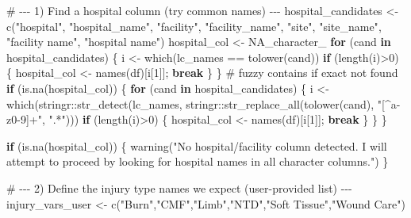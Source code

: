 \documentclass[
  letterpaper,
  DIV=11,
  numbers=noendperiod]{scrartcl}
\newenvironment{Shaded}{\begin{snugshade}}{\end{snugshade}}
\newcommand{\CommentTok}[1]{\textcolor[rgb]{0.37,0.37,0.37}{#1}}
\newcommand{\ConstantTok}[1]{\textcolor[rgb]{0.56,0.35,0.01}{#1}}
\newcommand{\ControlFlowTok}[1]{\textcolor[rgb]{0.00,0.23,0.31}{\textbf{#1}}}
\newcommand{\DecValTok}[1]{\textcolor[rgb]{0.68,0.00,0.00}{#1}}
\newcommand{\FunctionTok}[1]{\textcolor[rgb]{0.28,0.35,0.67}{#1}}
\newcommand{\NormalTok}[1]{\textcolor[rgb]{0.00,0.23,0.31}{#1}}
\newcommand{\OtherTok}[1]{\textcolor[rgb]{0.00,0.23,0.31}{#1}}
\newcommand{\SpecialCharTok}[1]{\textcolor[rgb]{0.37,0.37,0.37}{#1}}
\newcommand{\StringTok}[1]{\textcolor[rgb]{0.13,0.47,0.30}{#1}}
\begin{document}
\begin{Shaded}
\begin{Highlighting}[]
\CommentTok{\# {-}{-}{-} 1) Find a hospital column (try common names) {-}{-}{-}}
\NormalTok{hospital\_candidates }\OtherTok{\textless{}{-}} \FunctionTok{c}\NormalTok{(}\StringTok{"hospital"}\NormalTok{, }\StringTok{"hospital\_name"}\NormalTok{, }\StringTok{"facility"}\NormalTok{, }\StringTok{"facility\_name"}\NormalTok{, }\StringTok{"site"}\NormalTok{, }\StringTok{"site\_name"}\NormalTok{, }\StringTok{"facility name"}\NormalTok{, }\StringTok{"hospital name"}\NormalTok{)}
\NormalTok{hospital\_col }\OtherTok{\textless{}{-}} \ConstantTok{NA\_character\_}
\ControlFlowTok{for}\NormalTok{ (cand }\ControlFlowTok{in}\NormalTok{ hospital\_candidates) \{}
\NormalTok{  i }\OtherTok{\textless{}{-}} \FunctionTok{which}\NormalTok{(lc\_names }\SpecialCharTok{==} \FunctionTok{tolower}\NormalTok{(cand))}
  \ControlFlowTok{if}\NormalTok{ (}\FunctionTok{length}\NormalTok{(i)}\SpecialCharTok{\textgreater{}}\DecValTok{0}\NormalTok{) \{ hospital\_col }\OtherTok{\textless{}{-}} \FunctionTok{names}\NormalTok{(df)[i[}\DecValTok{1}\NormalTok{]]; }\ControlFlowTok{break}\NormalTok{ \}}
\NormalTok{\}}
\CommentTok{\# fuzzy contains if exact not found}
\ControlFlowTok{if}\NormalTok{ (}\FunctionTok{is.na}\NormalTok{(hospital\_col)) \{}
  \ControlFlowTok{for}\NormalTok{ (cand }\ControlFlowTok{in}\NormalTok{ hospital\_candidates) \{}
\NormalTok{    i }\OtherTok{\textless{}{-}} \FunctionTok{which}\NormalTok{(stringr}\SpecialCharTok{::}\FunctionTok{str\_detect}\NormalTok{(lc\_names, stringr}\SpecialCharTok{::}\FunctionTok{str\_replace\_all}\NormalTok{(}\FunctionTok{tolower}\NormalTok{(cand), }\StringTok{"[\^{}a{-}z0{-}9]+"}\NormalTok{, }\StringTok{".*"}\NormalTok{)))}
    \ControlFlowTok{if}\NormalTok{ (}\FunctionTok{length}\NormalTok{(i)}\SpecialCharTok{\textgreater{}}\DecValTok{0}\NormalTok{) \{ hospital\_col }\OtherTok{\textless{}{-}} \FunctionTok{names}\NormalTok{(df)[i[}\DecValTok{1}\NormalTok{]]; }\ControlFlowTok{break}\NormalTok{ \}}
\NormalTok{  \}}
\NormalTok{\}}

\ControlFlowTok{if}\NormalTok{ (}\FunctionTok{is.na}\NormalTok{(hospital\_col)) \{}
  \FunctionTok{warning}\NormalTok{(}\StringTok{"No hospital/facility column detected. I will attempt to proceed by looking for hospital names in all character columns."}\NormalTok{)}
\NormalTok{\}}

\CommentTok{\# {-}{-}{-} 2) Define the injury type names we expect (user{-}provided list) {-}{-}{-}}
\NormalTok{injury\_vars\_user }\OtherTok{\textless{}{-}} \FunctionTok{c}\NormalTok{(}\StringTok{"Burn"}\NormalTok{,}\StringTok{"CMF"}\NormalTok{,}\StringTok{"Limb"}\NormalTok{,}\StringTok{"NTD"}\NormalTok{,}\StringTok{"Soft Tissue"}\NormalTok{,}\StringTok{"Wound Care"}\NormalTok{)}


\end{Highlighting}
\end{Shaded}
\end{document}

